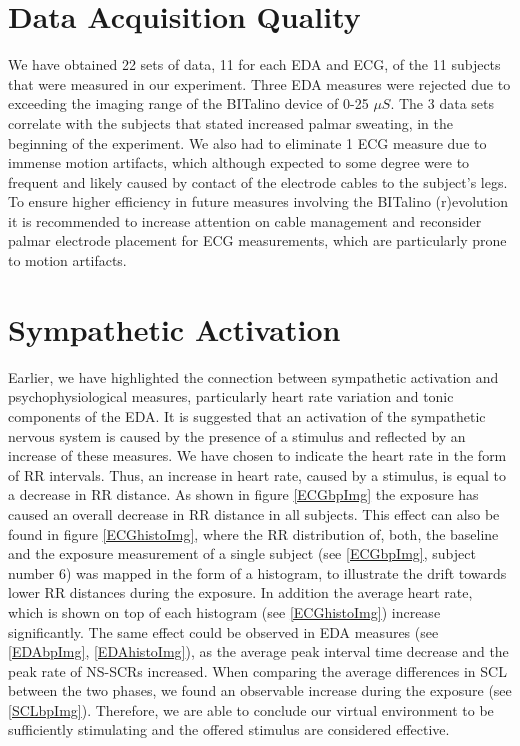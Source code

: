 
\section{Data Acquisition Quality}
We have obtained 22 sets of data, 11 for each EDA and ECG, of the 11 subjects that were measured in our experiment. Three EDA measures were rejected due to exceeding the imaging range of the BITalino device of 0-25 $\mu S$. The 3 data sets correlate with the subjects that stated increased palmar sweating, in the beginning of the experiment. We also had to eliminate 1 ECG measure due to immense motion artifacts, which although expected to some degree were to frequent and likely caused by contact of the electrode cables to the subject's legs. To ensure higher efficiency in future measures involving the BITalino (r)evolution it is recommended to increase attention on cable management and reconsider palmar electrode placement for ECG measurements, which are particularly prone to motion artifacts. 

\section{Sympathetic Activation}
Earlier, we have highlighted the connection between sympathetic activation and psychophysiological measures, particularly heart rate variation and tonic components of the EDA. It is suggested that an activation of the sympathetic nervous system is caused by the presence of a stimulus and reflected by an increase of these measures. We have chosen to indicate the heart rate in the form of RR intervals. Thus, an increase in heart rate, caused by a stimulus, is equal to a decrease in RR distance. As shown in figure \ref{ECGbpImg} the exposure has caused an overall decrease in RR distance in all subjects. This effect can also be found in figure \ref{ECGhistoImg}, where the RR distribution of, both, the baseline and the exposure measurement of a single subject (see \ref{ECGbpImg}, subject number 6) was mapped in the form of a histogram, to illustrate the drift towards lower RR distances during the exposure. In addition the average heart rate, which is shown on top of each histogram (see \ref{ECGhistoImg}) increase significantly.
The same effect could be observed in EDA measures (see \ref{EDAbpImg}, \ref{EDAhistoImg}), as the average peak interval time decrease and the peak rate of NS-SCRs increased. When comparing the average differences in SCL between the two phases, we found an observable increase during the exposure (see \ref{SCLbpImg}). Therefore, we are able to conclude our virtual environment to be sufficiently stimulating and the offered stimulus are considered effective. 

